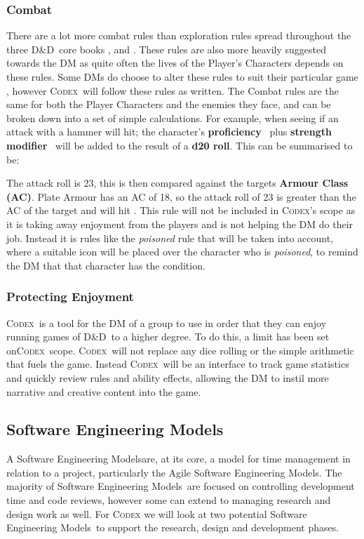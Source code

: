 \documentclass[review]{cmpreport}
\newcommand{\dnd}{D\&D}
\newcommand{\sems}{Software Engineering Models}
\newcommand{\Codex}{\textsc{Codex}}
\begin{document}
	\subsubsection{Combat}
	There are a lot more combat rules than exploration rules spread throughout the three \dnd \ core books \citep{DMGuide}, \citep{MonsterManual} and \citep{PlayerHandbook} . These rules are also more heavily suggested towards the DM as quite often the lives of the Player's Characters depends on these rules. Some DMs do choose to alter these rules to suit their particular game \citep{Personal}, however \Codex \ will follow these rules as written. The Combat rules are the same for both the Player Characters and the enemies they face, and can be broken down into a set of simple calculations. For example, when seeing if an attack with a hammer will hit; the character's \textbf{proficiency} \ plus \textbf{strength modifier} \ will be added to the result of a \textbf{d20 roll}. This can be summarised to be:

	The attack roll is 23, this is then compared against the targets \textbf{Armour Class (AC)}. Plate Armour has an AC of 18, so the attack roll of 23 is greater than the AC of the target and will hit \cite{PlayerHandbook}. This rule will not be included in \Codex's scope as it is taking away enjoyment from the players and is not helping the DM do their job. Instead it is rules like the \emph{poisoned} rule that will be taken into account, where a suitable icon will be placed over the character who is \emph{poisoned}, to remind the DM that that character has the condition.
	
	\subsubsection{Protecting Enjoyment}
	\Codex \ is a tool for the DM of a group to use in order that they can enjoy running games of \dnd \ to a higher degree. To do this, a limit has been set on\Codex \ scope. \Codex \ will not replace any dice rolling or the simple arithmetic that fuels the game. Instead \Codex \ will be an interface to track game statistics and quickly review rules and ability effects,  allowing the DM to instil more narrative and creative content into the game. 
	
	\subsection{Software Engineering Models}
	A \sems are, at its core, a model for time management in relation to a project, particularly the Agile \sems . The majority of \sems \ are focused on controlling development time and code reviews, however some can extend to managing research and design work as well. For \textsc{Codex} we will look at two potential \sems \ to support the research, design and development phases. 
	 
\end{document}
